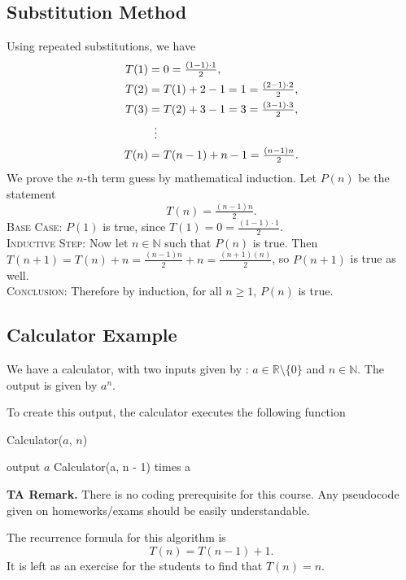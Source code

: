 \documentclass{article}
\begin{document}
\subsection*{Substitution Method}
    Using repeated substitutions, we have
    \begin{align*}
        T(1) &= 0 = \tfrac{(1 - 1) \cdot 1}{2}, \\
        T(2) &= T(1) + 2 - 1 = 1 = \tfrac{(2 - 1) \cdot 2}{2}, \\
        T(3) &= T(2) + 3 - 1 = 3 = \tfrac{(3 - 1) \cdot 3}{2}, \\
        &\vdotswithin{ = } \\
        T(n) &= T(n - 1) + n - 1 = \tfrac{(n - 1)n}{2}.
    \end{align*}
    We prove the $n$-th term guess by mathematical induction. Let $P(n)$ be the statement $$T(n) = \tfrac{(n - 1)n}{2}.$$
    \textsc{Base Case}: $P(1)$ is true, since $T(1) = 0 = \tfrac{(1 - 1) \cdot 1}{2}$. \\
    \textsc{Inductive Step}: Now let $n \in \mathbb{N}$ such that $P(n)$ is true. Then $T(n + 1) = T(n) + n = \tfrac{(n - 1)n}{2} + n = \tfrac{(n + 1)(n)}{2}$, so $P(n + 1)$ is true as well. \\
    \textsc{Conclusion}: Therefore by induction, for all $n \ge 1$, $P(n)$ is true.
    
\subsection*{Calculator Example}
    We have a calculator, with two inputs given by : $a \in \mathbb{R} \setminus \{0\}$ and $n \in \mathbb{N}$. The output is given by $a^{n}$.
    
    To create this output, the calculator executes the following function
    \begin{algorithm}
    \caption{Calculator($a$, $n$)}\label{alg:Calc1}
    \begin{algorithmic}
            \State output $a$
            \State Calculator(a, n - 1) times a
        \EndIf
    \end{algorithmic}
    \end{algorithm}

    \vspace{1.5mm}
    \textbf{TA Remark.} There is no coding prerequisite for this course. Any pseudocode given on homeworks/exams should be easily understandable.
    
    \vspace{1.5mm}
    The recurrence formula for this algorithm is $$T(n) = T(n - 1) + 1.$$ It is left as an exercise for the students to find that $T(n) = n$.
    
\end{document}
